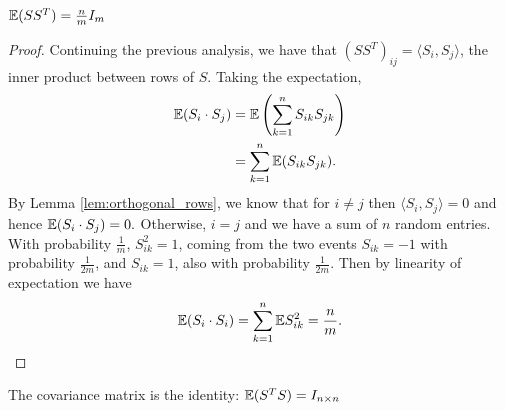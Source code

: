 \begin{Lemma}
  $\mathbb{E}(SS^T) = \frac{n}{m} I_m$
\end{Lemma}

\begin{proof}
Continuing the previous analysis, we have that $(S S^T)_{ij} = \langle S_i, S_j \rangle$,  the inner product between rows of $S$.
Taking the expectation, 
  \begin{align}
    \mathbb{E} (S_i \cdot S_j) &= \mathbb{E} \left( \sum_{k=1}^n S_{ik} S_{jk} \right) \\
                       &= \sum_{k=1}^n \mathbb{E} (S_{ik} S_{jk}).
  \end{align}
By Lemma \ref{lem:orthogonal_rows}, we know that for $i \neq j$ then $\langle S_i, S_j \rangle = 0$ and hence $\mathbb{E} (S_i \cdot S_j) = 0.$
Otherwise, $i=j$
and we have a sum of $n$ random entries.
With probability $\frac1{m}$, $S^2_{ik} = 1$,
coming from the two events $S_{ik} = -1$ with probability
$\frac1{2m}$, and $S_{ik}=1$, also with probability $\frac1{2m}$. 
Then by linearity of expectation we have
  \begin{equation}
    \mathbb{E} (S_i \cdot S_i) = \sum_{k=1}^n \mathbb{E} S_{ik}^2 =
     \frac{n}{m}.
  \end{equation}
\end{proof}

\begin{Lemma} \label{lem:covariance_matrix}
  The covariance matrix is the identity: $\mathbb{E}(S^TS) = I_{n \times n}$
\end{Lemma}

